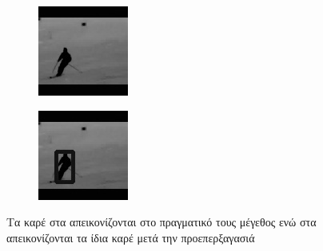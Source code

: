 \begin{figure}[h]
\begin{subfigure}{0.35\textwidth}
    \includegraphics[width=\textwidth]{./figures/transformed_image.jpg}
    \caption{}
    \label{fig:gr_trans_image}
  \end{subfigure}
  \hfill
  \begin{subfigure}{0.35\textwidth}
    \en
    \includegraphics[width=\textwidth]{./figures/transformed_image_rois.jpg}
    \caption{}
    \label{fig:gr_trans_image_rois}
  \end{subfigure}
  \caption{\gr Τα καρέ στα  \gr απεικονίζονται στο πραγματικό τους μέγεθος ενώ στα  απεικονίζονται τα ίδια καρέ μετά την προεπερξαγασιά \en}
  \label{fig:gr_Preprocess_example}
\end{figure}


